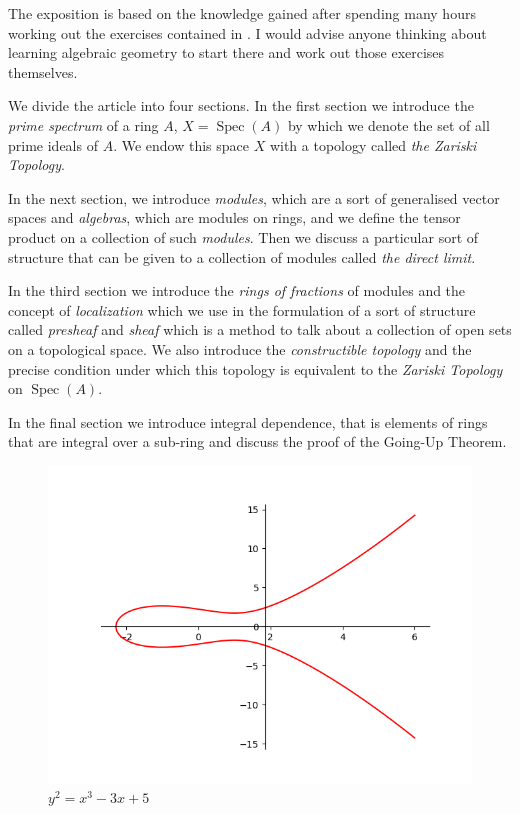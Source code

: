 \documentclass[]{report}
\DeclareMathOperator\Spec{Spec}
\begin{document}
    The exposition is based on the knowledge gained after spending many hours working out the exercises contained in \cite{atiyah1}. I would advise anyone thinking about learning algebraic geometry to start there and work out those exercises themselves.  

    We divide the article into four sections. In the first section we introduce the \textit{prime spectrum} of a ring $A$, $X = \Spec(A)$ by which we denote the set of all prime ideals of $A$. We endow this space $X$ with a topology called \textit{the Zariski Topology}.

    In the next section, we introduce \textit{modules}, which are a sort of generalised vector spaces and \textit{algebras}, which are modules on rings, and we define the tensor product on a collection of such \textit{modules}. Then we discuss a particular sort of structure that can be given to a collection of modules called \textit{the direct limit}.

    In the third section we introduce the \textit{rings of fractions} of modules and the concept of \textit{localization} which we use in the formulation of a sort of structure called \textit{presheaf} and \textit{sheaf} which is a method to talk about a collection of open sets on a topological space. We also introduce the \textit{constructible topology} and the precise condition under which this topology is equivalent to the \textit{Zariski Topology} on $\Spec(A)$. 

    In the final section we introduce integral dependence, that is elements of rings that are integral over a sub-ring and discuss the proof of the Going-Up Theorem.


\begin{figure}
  \includegraphics[width=\linewidth]{img/ell_curv1.png}
  \caption{$y^2 = x^3 - 3x + 5$}
  \label{ell_curv1}
\end{figure}
\end{document}
